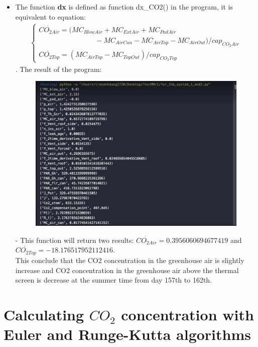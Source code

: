 \documentclass[a4paper]{article}
\numberwithin{equation}{section}
\begin{document}
\begin{itemize}
\item The function \textbf{dx} is defined as function dx\_CO2() in the program, it is equivalent to equation:
        \begin{align*}
          \begin{cases}
            \dot{CO_{2Air}} = (MC_{BlowAir} + MC_{ExtAir} + MC_{PadAir} \\ \qquad \qquad \qquad \qquad
            - MC_{AirCan} - MC_{AirTop} - MC_{AirOut}) / cap_{CO_2Air}  \\
            \dot{CO_{2Top}} = (MC_{AirTop} - MC_{TopOut}) / cap_{CO_2Top}
          \end{cases}
        \end{align*}.
    The result of the program:
    \begin{figure}[H]
        \centering
        \includegraphics[width=15cm]{Result3.png}
    \end{figure}
    \item[-] This function will return two results: \(\dot{CO_{2Air}} = 0.3956060694677419\) and \(\dot{CO_{2Top}} = -18.176517952112416.\)\\
    This conclude that the CO2 concentration in the greenhouse air is slightly increase and CO2 concentration in the greenhouse air above the thermal screen is decrease at the summer time from day 157th to 162th.
\end{itemize}

	
\section{Calculating \texorpdfstring{\(CO_2\)}{} concentration with Euler and Runge-Kutta algorithms}
\end{document}

